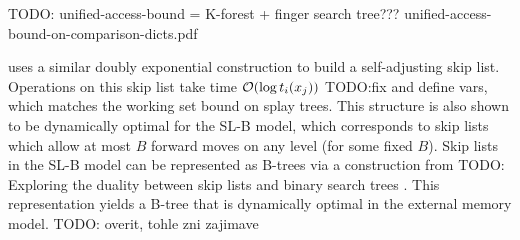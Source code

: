TODO: unified-access-bound = K-forest + finger search tree???
unified-access-bound-on-comparison-dicts.pdf

\cite{dynamic-optimality-for-sl} uses a similar doubly exponential construction
to build a self-adjusting skip list. Operations on this skip list take time
$\mathcal{O}(\log t_i(x_j))$ TODO:fix and define vars, which matches the working set
bound on splay trees. This structure is also shown to be dynamically optimal
for the SL-B model, which corresponds to skip lists which allow at most
$B$ forward moves on any level (for some fixed $B$). Skip lists in the
SL-B model can be represented as B-trees via a construction from
TODO: Exploring the duality between skip lists and binary search trees
. This representation yields a B-tree that is dynamically optimal
in the external memory model.
TODO: overit, tohle zni zajimave
